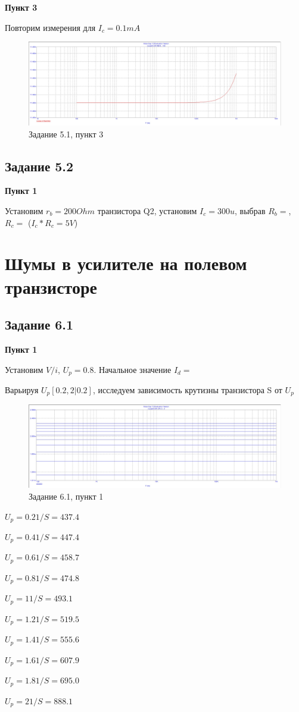 \documentclass[a4paper, 14pt]{extarticle}%
\begin{document}
\textbf{Пункт 3}


Повторим измерения для $I_c = 0.1mA$

\begin{figure}[h!]
			\centering
			\includegraphics[width=1.1\linewidth]{5/5_1_4.jpg}
			\caption{Задание 5.1, пункт 3}
			\label{A}
\end{figure}


\subsection{Задание 5.2}
\textbf{Пункт 1}


Установим $r_b = 200Ohm$ транзистора Q2, установим $I_c = 300u$, выбрав $R_b = $, $R_c = $ ($I_c*R_c = 5V$)

\section{Шумы в усилителе на полевом транзисторе}

\subsection{Задание 6.1}
\textbf{Пункт 1}


Установим ${V/i}$, $U_p = 0.8$. Начальное значение $I_d = $

Варьируя $U_p[0.2,2|0.2]$, исследуем зависимость крутизны транзистора S от $U_p$

\begin{figure}[h!]
			\centering
			\includegraphics[width=1.1\linewidth]{6/6_1_1.jpg}
			\caption{Задание 6.1, пункт 1}
			\label{A}
\end{figure}

$U_p = 0.2 1/S = 437.4$

$U_p = 0.4 1/S = 447.4$

$U_p = 0.6 1/S = 458.7$

$U_p = 0.8 1/S = 474.8$

$U_p = 1 1/S = 493.1$

$U_p = 1.2 1/S = 519.5$

$U_p = 1.4 1/S = 555.6$

$U_p = 1.6 1/S = 607.9$

$U_p = 1.8 1/S = 695.0$

$U_p = 2 1/S = 888.1$
\end{document}
